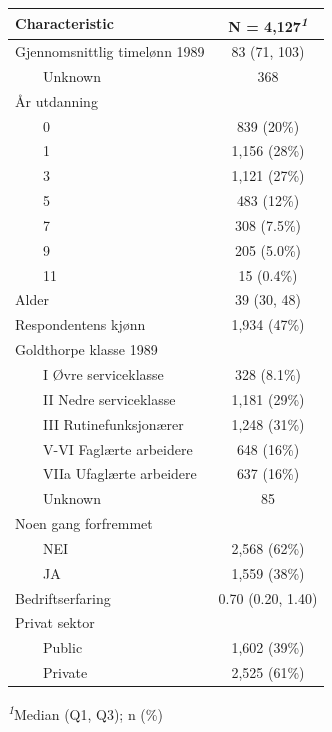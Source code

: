 \documentclass[
  norsk,
  letterpaper,
  DIV=11,
  numbers=noendperiod]{scrreprt}
\theoremstyle{definition}
\theoremstyle{remark}
\begin{document}
\begin{table}
\fontsize{12.0pt}{14.0pt}\selectfont
\begin{tabular*}{\linewidth}{@{\extracolsep{\fill}}lc}
\toprule
\textbf{Characteristic} & \textbf{N = 4,127}\textsuperscript{\textit{1}} \\ 
\midrule\addlinespace[2.5pt]
Gjennomsnittlig timelønn 1989 & 83 (71, 103) \\ 
    Unknown & 368 \\ 
År utdanning &  \\ 
    0 & 839 (20\%) \\ 
    1 & 1,156 (28\%) \\ 
    3 & 1,121 (27\%) \\ 
    5 & 483 (12\%) \\ 
    7 & 308 (7.5\%) \\ 
    9 & 205 (5.0\%) \\ 
    11 & 15 (0.4\%) \\ 
Alder & 39 (30, 48) \\ 
Respondentens kjønn & 1,934 (47\%) \\ 
Goldthorpe klasse 1989 &  \\ 
    I Øvre serviceklasse & 328 (8.1\%) \\ 
    II Nedre serviceklasse & 1,181 (29\%) \\ 
    III Rutinefunksjonærer & 1,248 (31\%) \\ 
    V-VI Faglærte arbeidere & 648 (16\%) \\ 
    VIIa Ufaglærte arbeidere & 637 (16\%) \\ 
    Unknown & 85 \\ 
Noen gang forfremmet &  \\ 
    NEI & 2,568 (62\%) \\ 
    JA & 1,559 (38\%) \\ 
Bedriftserfaring & 0.70 (0.20, 1.40) \\ 
Privat sektor &  \\ 
    Public & 1,602 (39\%) \\ 
    Private & 2,525 (61\%) \\ 
\bottomrule
\end{tabular*}
\begin{minipage}{\linewidth}
\vspace{.05em}
\textsuperscript{\textit{1}}Median (Q1, Q3); n (\%)\\
\end{minipage}
\end{table}
\end{document}
